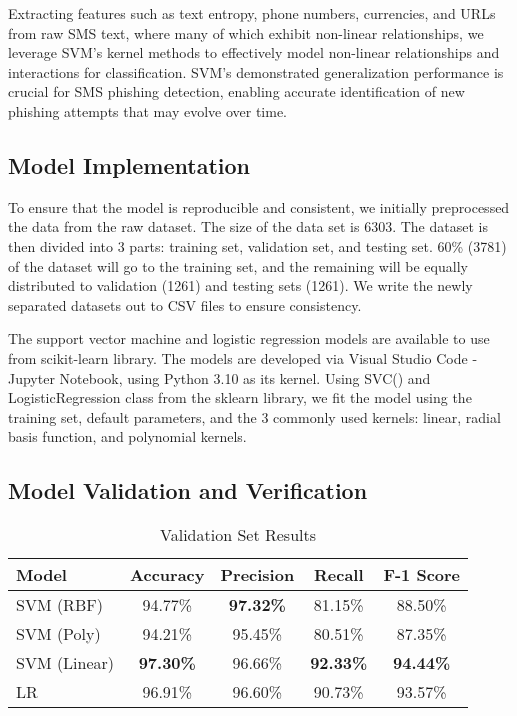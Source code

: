 \documentclass[conference]{IEEEtran}
\begin{document}
Extracting features such as text entropy, phone numbers, currencies, and URLs from raw SMS text, where many of which exhibit non-linear relationships, we leverage SVM's kernel methods to effectively model non-linear relationships and interactions for classification. SVM's demonstrated generalization performance is crucial for SMS phishing detection, enabling accurate identification of new phishing attempts that may evolve over time.

\subsection*{Model Implementation}

To ensure that the model is reproducible and consistent, we initially preprocessed the data from the raw dataset. The size of the data set is 6303. The dataset is then divided into 3 parts: training set, validation set, and testing set. 60\% (3781) of the dataset will go to the training set, and the remaining will be equally distributed to validation (1261) and testing sets (1261). We write the newly separated datasets out to CSV files to ensure consistency.

The support vector machine and logistic regression models are available to use from scikit-learn library. The models are developed via Visual Studio Code - Jupyter Notebook, using Python 3.10 as its kernel. Using SVC() and LogisticRegression class from the sklearn library, we fit the model using the training set, default parameters, and the 3 commonly used kernels: linear, radial basis function, and polynomial kernels.

\subsection*{Model Validation and Verification}

\begin{table}[htbp]
    \small
    \centering
    \caption{Validation Set Results}
    \label{tab:svm-logreg-comparison}
    \begin{tabular}{lcccc}
      \toprule
      \textbf{Model} & \textbf{Accuracy} & \textbf{Precision} & \textbf{Recall} & \textbf{F-1 Score}\\
      \midrule
      SVM (RBF) & 94.77\% & \textbf{97.32\%} & 81.15\% & 88.50\% \\
      SVM (Poly) & 94.21\% & 95.45\% & 80.51\% & 87.35\% \\
      SVM (Linear) & \textbf{97.30\%} & 96.66\% & \textbf{92.33\%} & \textbf{94.44\%} \\
      LR & 96.91\% & 96.60\% & 90.73\% & 93.57\% \\
      \bottomrule
    \end{tabular}
\end{table}
\end{document}
